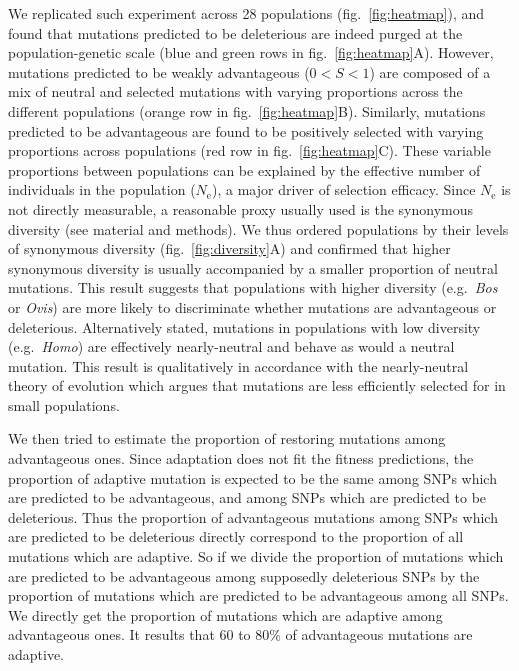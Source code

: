 \documentclass{article}
\newcommand{\Ne}{N_{\mathrm{e}}}
\newcommand{\Sphy}{S}
\newcommand{\divWeakAdv}{0 < \Sphy < 1}
\begin{document}
    We replicated such experiment across 28 populations (fig.~\ref{fig:heatmap}), and found that mutations predicted to be deleterious are indeed purged at the population-genetic scale (blue and green rows in fig.~\ref{fig:heatmap}A).
    However, mutations predicted to be weakly advantageous ($\divWeakAdv$) are composed of a mix of neutral and selected mutations with varying proportions across the different populations (orange row in fig.~\ref{fig:heatmap}B).
    Similarly, mutations predicted to be advantageous are found to be positively selected with varying proportions across populations (red row in fig.~\ref{fig:heatmap}C).
    These variable proportions between populations can be explained by the effective number of individuals in the population ($\Ne$), a major driver of selection efficacy.
    Since $\Ne$ is not directly measurable, a reasonable proxy usually used is the synonymous diversity (see material and methods).
    We thus ordered populations by their levels of synonymous diversity (fig.~\ref{fig:diversity}A) and confirmed that higher synonymous diversity is usually accompanied by a smaller proportion of neutral mutations.
    This result suggests that populations with higher diversity (e.g.~\textit{Bos} or \textit{Ovis}) are more likely to discriminate whether mutations are advantageous or deleterious.
    Alternatively stated, mutations in populations with low diversity (e.g.~\textit{Homo}) are effectively nearly-neutral and behave as would a neutral mutation.
    This result is qualitatively in accordance with the nearly-neutral theory of evolution which argues that mutations are less efficiently selected for in small populations.

    We then tried to estimate the proportion of restoring mutations among advantageous ones.
    Since adaptation does not fit the fitness predictions, the proportion of adaptive mutation is expected to be the same among SNPs which are predicted to be advantageous, and among SNPs which are predicted to be deleterious.
    Thus the proportion of advantageous mutations among SNPs which are predicted to be deleterious directly correspond to the proportion of all mutations which are adaptive.
    So if we divide the proportion of mutations which are predicted to be advantageous among supposedly deleterious SNPs by the proportion of mutations which are predicted to be advantageous among all SNPs.
    We directly get the proportion of mutations which are adaptive among advantageous ones. It results that 60 to 80\% of advantageous mutations are adaptive.
\end{document}

